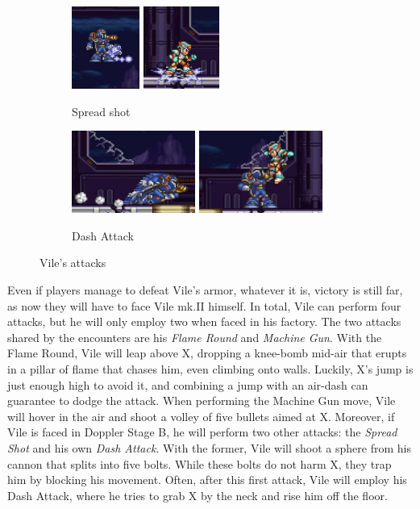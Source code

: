 \begin{figure}[htp]
\begin{subfigure}{\linewidth}
		\includegraphics[height=2.7cm]{figures/X3/Doppler_stages/vile_par_11.jpg}
		\includegraphics[height=2.7cm]{figures/X3/Doppler_stages/vile_par_2.jpg}
		\caption{Spread shot}
	\end{subfigure}
	\begin{subfigure}{\linewidth}
		\centering
		\includegraphics[height=2.7cm]{figures/X3/Doppler_stages/vile_dash_1.jpg}
		\includegraphics[height=2.7cm]{figures/X3/Doppler_stages/vile_dash_2.jpg}
		\caption{Dash Attack}
	\end{subfigure}
	\caption{Vile's attacks}
\end{figure}

Even if players manage to defeat Vile's armor, whatever it is, victory is still far, as now they will have to face Vile mk.II himself. In total, Vile can perform four attacks, but he will only employ two when faced in his factory. The two attacks shared by the encounters are his \emph{Flame Round} and \emph{Machine Gun}. With the Flame Round, Vile will leap above X, dropping a knee-bomb mid-air that erupts in a pillar of flame that chases him, even climbing onto walls. Luckily, X's jump is just enough high to avoid it, and combining a jump with an air-dash can guarantee to dodge the attack. When performing the Machine Gun move, Vile will hover in the air and shoot a volley of five bullets aimed at X. Moreover, if Vile is faced in Doppler Stage B, he will perform two other attacks: the \emph{Spread Shot} and his own \emph{Dash Attack}. With the former, Vile will shoot a sphere from his cannon that splits into five bolts. While these bolts do not harm X, they trap him by blocking his movement. Often, after this first attack, Vile will employ his Dash Attack, where he tries to grab X by the neck and rise him off the floor.

